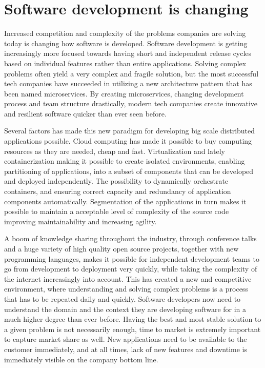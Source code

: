 \chapter{Software development is changing}
\label{ch:introduction}
Increased competition and complexity of the problems companies are solving today is changing how software is developed. Software development is getting increasingly more focused towards having short and independent release cycles based on individual features rather than entire applications. Solving complex problems often yield a very complex and fragile solution, but the most successful tech companies have succeeded in utilizing a new architecture pattern that has been named microservices. By creating microservices, changing development process and team structure drastically, modern tech companies create innovative and resilient software quicker than ever seen before.

Several factors has made this new paradigm for developing big scale distributed applications possible. Cloud computing has made it possible to buy computing resources as they are needed, cheap and fast. Virtualization and lately containerization making it possible to create isolated environments, enabling partitioning of applications, into a subset of components that can be developed and deployed independently. The possibility to dynamically orchestrate containers, and ensuring correct capacity and redundancy of application components automatically. Segmentation of the applications in turn makes it possible to maintain a acceptable level of complexity of the source code improving maintainability and increasing agility.

A boom of knowledge sharing throughout the industry, through conference talks and a huge variety of high quality open source projects, together with new programming languages, makes it possible for independent development teams to go from development to deployment very quickly, while taking the complexity of the internet increasingly into account. This has created a new and competitive environment, where understanding and solving complex problems is a process that has to be repeated daily and quickly. Software developers now need to understand the domain and the context they are developing software for in a much higher degree than ever before. 
Having the best and most stable solution to a given problem is not necessarily enough, time to market is extremely important to capture market share as well. New applications need to be available to the customer immediately, and at all times, lack of new features and downtime is immediately visible on the company bottom line.

